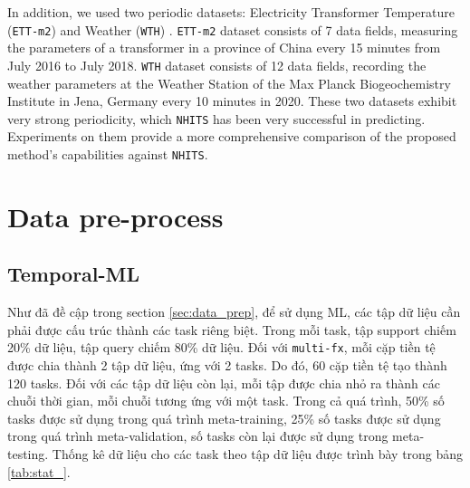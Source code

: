 
In addition, we used two periodic datasets: Electricity Transformer Temperature (\verb|ETT-m2|) \cite{zhou2021informer} and Weather (\verb|WTH|) \cite{Kolle}. \verb|ETT-m2| dataset consists of 7 data fields, measuring the parameters of a transformer in a province of China every 15 minutes from July 2016 to July 2018. \verb|WTH| dataset consists of 12 data fields, recording the weather parameters at the Weather Station of the Max Planck Biogeochemistry Institute in Jena, Germany every 10 minutes in 2020. These two datasets exhibit very strong periodicity, which \verb|NHITS| has been very successful in predicting. Experiments on them provide a more comprehensive comparison of the proposed method's capabilities against \verb|NHITS|.

\section{Data pre-process}

\subsection{Temporal-ML}
\label{subsec:ml_experiment}

Như đã đề cập trong section \ref{sec:data_prep}, để sử dụng ML, các tập dữ liệu cần phải được cấu trúc thành các task riêng biệt. Trong mỗi task, tập support chiếm 20\% dữ liệu, tập query chiếm 80\% dữ liệu. Đối với \verb|multi-fx|, mỗi cặp tiền tệ được chia thành 2 tập dữ liệu, ứng với 2 tasks. Do đó, 60 cặp tiền tệ tạo thành 120 tasks. Đối với các tập dữ liệu còn lại, mỗi tập được chia nhỏ ra thành các chuỗi thời gian, mỗi chuỗi tương ứng với một task. Trong cả quá trình, 50\% số tasks được sử dụng trong quá trình meta-training, 25\% số tasks được sử dụng trong quá trình meta-validation, số tasks còn lại được sử dụng trong meta-testing. Thống kê dữ liệu cho các task theo tập dữ liệu được trình bày trong bảng \ref{tab:stat_}.

